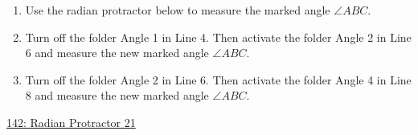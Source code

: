 \documentclass{ximera}
\begin{document}
\begin{question} \label{Q5fggtg4t4tggdet4}
\begin{enumerate}
\item Use the radian protractor below to measure the marked angle $\angle ABC$.

\item Turn off the folder Angle 1 in Line 4. Then activate the folder Angle 2 in Line 6 and measure the new marked angle $\angle ABC$.

\item Turn off the folder Angle 2 in Line 6. Then activate the folder Angle 4 in Line 8 and measure the new marked angle $\angle ABC$.

\end{enumerate}

\begin{onlineOnly}
    \begin{center}
\end{center}
\end{onlineOnly}

\href{https://www.desmos.com/calculator/dqedbpsohm}{142: Radian Protractor 21}
\end{question}
\end{document}
